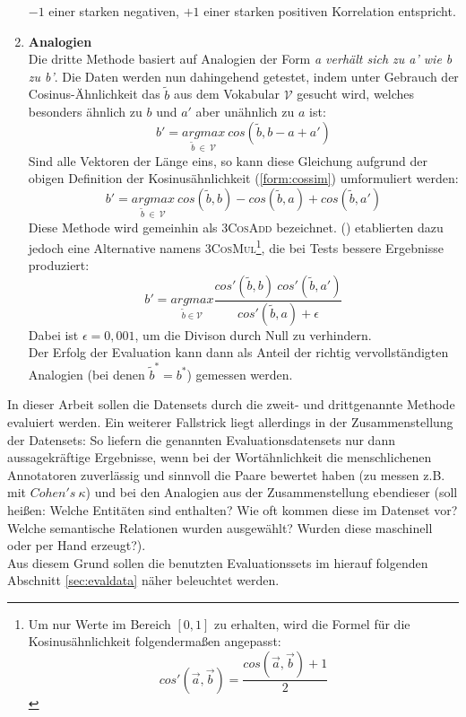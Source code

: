 \begin{enumerate}
      $-1$ einer starken negativen, $+1$ einer starken positiven Korrelation entspricht.
    \item \textbf{Analogien}\\
      Die dritte Methode basiert auf Analogien der Form \emph{a verhält sich zu a' wie b zu b'}.
      Die Daten werden nun dahingehend getestet, indem unter Gebrauch der Cosinus-Ähnlichkeit
      das $\tilde{b}$ aus dem Vokabular $\mathcal{V}$ gesucht wird, welches besonders ähnlich zu $b$ und $a'$ aber unähnlich zu $a$ ist:
      \begin{equation}
        b' = \underset{\tilde{b}\ \in\ \mathcal{V}}{argmax}\ cos(\tilde{b}, b - a + a')
      \end{equation}
      Sind alle Vektoren der Länge eins, so kann diese Gleichung aufgrund der obigen Definition der Kosinusähnlichkeit
      (\ref{form:cossim}) umformuliert werden:
      \begin{equation}
        b' = \underset{\tilde{b}\ \in\ \mathcal{V}}{argmax}\ cos(\tilde{b}, b) - cos(\tilde{b}, a) + cos(\tilde{b}, a')
      \end{equation}
      Diese Methode wird gemeinhin als \textsc{3CosAdd} bezeichnet. (\cite{levy2014linguistic}) etablierten dazu jedoch
      eine Alternative namens \textsc{3CosMul}\footnote{Um nur Werte im Bereich $[0,1]$ zu erhalten, wird die Formel
      für die Kosinusähnlichkeit folgendermaßen angepasst:
      \[
        cos'(\vec{a}, \vec{b}) = \frac{cos(\vec{a}, \vec{b}) + 1}{2}
      \]}, die bei Tests bessere Ergebnisse produziert:
      \begin{equation}
        b' = \underset{\tilde{b} \in \mathcal{V}}{argmax} \frac{cos'(\tilde{b}, b)\ cos'(\tilde{b}, a')}{cos'(\tilde{b}, a) + \epsilon}
      \end{equation}
      Dabei ist $\epsilon = 0,001$, um die Divison durch Null zu verhindern.\\
      Der Erfolg der Evaluation kann dann als Anteil der richtig vervollständigten Analogien (bei denen $\tilde{b}^* = b^*$) gemessen werden.
  \end{enumerate}
  In dieser Arbeit sollen die Datensets durch die zweit- und drittgenannte Methode evaluiert werden.
  Ein weiterer Fallstrick liegt allerdings in der Zusammenstellung der Datensets: So liefern
  die genannten Evaluationsdatensets nur dann aussagekräftige Ergebnisse, wenn bei der Wortähnlichkeit die menschlichenen
  Annotatoren zuverlässig und sinnvoll die Paare bewertet haben (zu messen z.B. mit $Cohen's\ \kappa$) und bei
  den Analogien aus der Zusammenstellung ebendieser (soll heißen: Welche Entitäten sind enthalten? Wie oft kommen diese
  im Datenset vor? Welche semantische Relationen wurden ausgewählt? Wurden diese maschinell oder per Hand erzeugt?).\\
  Aus diesem Grund sollen die benutzten Evaluationssets im hierauf folgenden Abschnitt \ref{sec:evaldata} näher beleuchtet werden.

